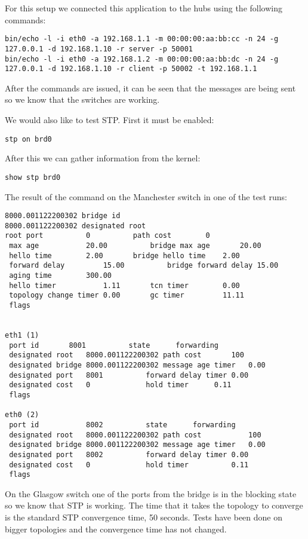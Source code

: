 For this setup we connected this application to the hubs using the following commands:
\lstset{language=text, caption=Starting the hosts}
\begin{lstlisting}
bin/echo -l -i eth0 -a 192.168.1.1 -m 00:00:00:aa:bb:cc -n 24 -g 127.0.0.1 -d 192.168.1.10 -r server -p 50001
bin/echo -l -i eth0 -a 192.168.1.2 -m 00:00:00:aa:bb:dc -n 24 -g 127.0.0.1 -d 192.168.1.10 -r client -p 50002 -t 192.168.1.1
\end{lstlisting}
After the commands are issued, it can be seen that the messages are being sent so we know that the switches are working.

We would also like to test STP. First it must be enabled:
\lstset{language=text, caption=Enabeling STP}
\begin{lstlisting}
stp on brd0
\end{lstlisting}
After this we can gather information from the kernel:
\lstset{language=text, caption=Getting STP information}
\begin{lstlisting}
show stp brd0
\end{lstlisting}
The result of the command on the Manchester switch in one of the test runs:
\lstset{language=text, caption=STP information}
\begin{lstlisting}
8000.001122200302 bridge id		
8000.001122200302 designated root	
root port	       0		  path cost	       0
 max age	       20.00		  bridge max age       20.00
 hello time	       2.00		  bridge hello time    2.00
 forward delay	       15.00	  	  bridge forward delay 15.00
 aging time	       300.00
 hello timer	       1.11		  tcn timer	       0.00
 topology change timer 0.00		  gc timer	       11.11
 flags			


eth1 (1)
 port id	   8001		     state      forwarding
 designated root   8000.001122200302 path cost		 100
 designated bridge 8000.001122200302 message age timer	 0.00
 designated port   8001		     forward delay timer 0.00
 designated cost   0		     hold timer		 0.11
 flags			

eth0 (2)
 port id           8002		     state      forwarding
 designated root   8000.001122200302 path cost           100
 designated bridge 8000.001122200302 message age timer   0.00
 designated port   8002		     forward delay timer 0.00
 designated cost   0		     hold timer	         0.11
 flags			
\end{lstlisting}
On the Glasgow switch one of the ports from the bridge is in the blocking state
so we know that STP is working. The time that it takes the topology to converge
is the standard STP convergence time, 50 seconds. Tests have been done on bigger
topologies and the convergence time has not changed.

